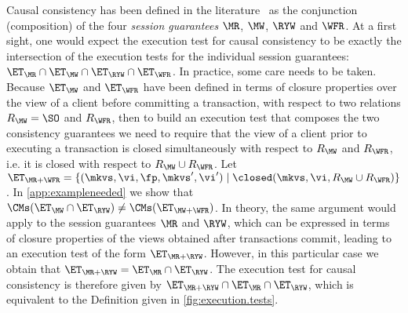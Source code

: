 Causal consistency has been defined in the literature~\cite{session2causal} 
as the conjunction (composition) of the four \emph{session guarantees} \(\MR\), \(\MW\), \(\RYW\) and \(\WFR\). 
At a first sight, one would expect the execution test for causal consistency to be exactly 
the intersection of the execution tests for the individual session guarantees: $\ET_{\MR} \cap \ET_{\MW} \cap \ET_{\RYW} \cap 
\ET_{\WFR}$. In practice, some care needs to be taken. Because $\ET_{\MW}$ and $\ET_{\WFR}$ have been 
defined in terms of closure properties over the view of a client before committing a transaction, with respect 
to two relations $R_{\MW} = \SO$ and $R_{\WFR}$, then to build an execution test that composes the two 
consistency guarantees we need to require that the view of a client prior to executing a transaction is 
closed simultaneously with respect to $R_{\MW}$ and $R_{\WFR}$, i.e. it is closed with respect to 
$R_{\MW} \cup R_{\WFR}$. Let $\ET_{\MR+\WFR} = \{(\mkvs, \vi, \fp, \mkvs', \vi') \mid \closed(\mkvs, \vi, R_{\MW} \cup R_{\WFR})\}$. 
In \cref{app:exampleneeded} we show that $\CMs(\ET_{\MW} \cap \ET_{\RYW}) \neq \CMs(\ET_{\MW+\WFR})$. 
In theory, the same argument would apply to the session guarantees $\MR$ and $\RYW$, which 
can be expressed in terms of closure properties of the views obtained after transactions commit, leading 
to an execution test of the form $\ET_{\MR+\RYW}$. However, in this particular case we obtain that 
$\ET_{\MR+\RYW} = \ET_{\MR} \cap \ET_{\RYW}$. The execution test for causal consistency is therefore 
given by $\ET_{\MR+\RYW} \cap \ET_{\MR} \cap \ET_{\RYW}$, which is equivalent to the Definition given in 
\ref{fig:execution.tests}.

